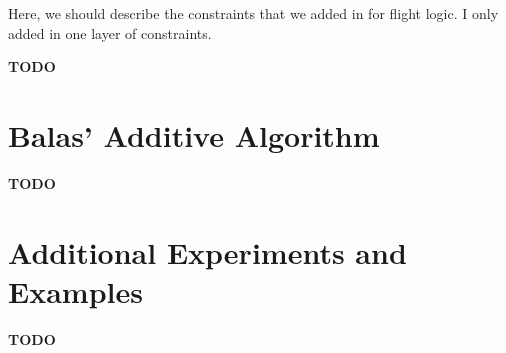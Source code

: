 \documentclass{article}
\begin{document}
Here, we should describe the constraints that we added in for flight logic. I only added in one layer of constraints.

{\bf TODO}

\section{Balas' Additive Algorithm}\label{app:balas}

{\bf TODO}

\section{Additional Experiments and Examples}\label{app:additional_experiments_and_examples}

{\bf TODO}

\end{document}
